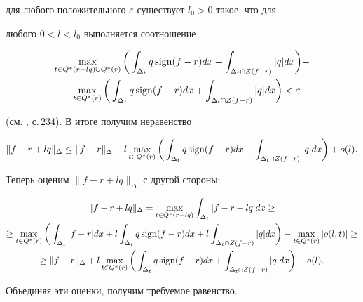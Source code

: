 \begin{pf}
для любого положительного $\varepsilon$ существует $l_0>0$ такое, что для 


любого $0<l<l_0$ выполняется соотношение 


\begin{multline*} 


\max_{t\in Q^*(r-l q)\cup Q^*(r)}\bigg(\int_{\Delta_t} 


q\sign(f-r)dx+ \int_{\Delta_t\cap Z(f-r)}|q|dx\bigg)- \\ 


% 


-\max_{t\in Q^*(r)}\bigg(\int_{\Delta_t}q\sign(f-r)dx+ 


\int_{\Delta_t\cap Z(f-r)}|q|dx\bigg)<\varepsilon 


\end{multline*} 


(см. \cite{5}, с.\,234). В итоге получим неравенство 


$$ 


\|f-r+l q\|_\Delta\le\|f-r\|_\Delta+l\max_{t\in Q^*(r)}\bigg( 


\int_{\Delta_t}


q\sign(f-r)dx+\int_{\Delta_t\cap Z(f-r)}|q|dx\bigg)+o(l). 


$$ 


Теперь оценим $\|f-r+l q\|_\Delta$ с другой стороны: 


\begin{multline*} 


\|f-r+l q\|_\Delta=\max_{t\in Q^*(r-l q)}\int_{\Delta_t} 


|f-r+l q|dx\ge \\ 


% 


\ge \max_{t\in Q^*(r)}\bigg(\int_{\Delta_t} 


|f-r|dx+l\int_{\Delta_t}q\sign(f-r)dx+l 


\int_{\Delta_t\cap Z(f-r)}|q|dx\bigg) 


-\max_{t\in Q^*(r)}|o(l,t)|\ge \\ 


% 


\ge\|f-r\|_\Delta+l\max_{t\in Q^*(r)}\bigg( 


\int_{\Delta_t}q\sign(f-r)dx+ 


\int_{\Delta_t\cap Z(f-r)}|q|dx\bigg)-o(l). 


\end{multline*} 


Объединяя эти оценки, получим требуемое равенство. 


\end{pf} 


